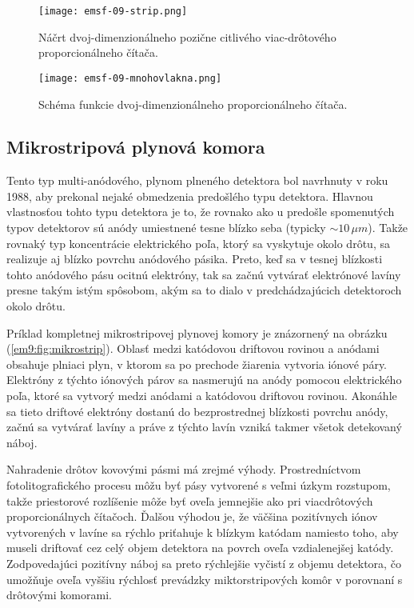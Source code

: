 \documentclass[../../main.tex]{subfiles}
\begin{document}
\begin{figure}[!h]
\texttt{[image: emsf-09-strip.png]}
\centering
\caption{Náčrt dvoj-dimenzionálneho pozične citlivého viac-drôtového proporcionálneho čítača.}
\label{em9:fig:strip}
\end{figure}
\begin{figure}[!h]
\texttt{[image: emsf-09-mnohovlakna.png]}
\centering
\caption{Schéma funkcie dvoj-dimenzionálneho proporcionálneho čítača.}
\label{em9:fig:mnohovlakna}
\end{figure}

\subsection{Mikrostripová plynová komora}
Tento typ multi-anódového, plynom plneného detektora bol navrhnuty v roku 1988, aby prekonal nejaké obmedzenia predošlého typu detektora. Hlavnou vlastnosťou tohto typu detektora je to, že rovnako ako u predošle spomenutých typov detektorov sú anódy umiestnené tesne blízko seba (typicky $\sim 10\,\mu m$). Takže rovnaký typ koncentrácie elektrického poľa, ktorý sa vyskytuje okolo drôtu, sa realizuje aj blízko povrchu anódového pásika. Preto, keď sa v tesnej blízkosti tohto anódového pásu ocitnú elektróny, tak sa začnú vytvárať elektrónové lavíny presne takým istým spôsobom, akým sa to dialo v predchádzajúcich detektoroch okolo drôtu.

Príklad kompletnej mikrostripovej plynovej komory je znázornený na obrázku (\ref{em9:fig:mikrostrip}). Oblasť medzi katódovou driftovou rovinou a anódami obsahuje plniaci plyn, v ktorom sa po prechode žiarenia vytvoria iónové páry. Elektróny z týchto iónových párov sa nasmerujú na anódy pomocou elektrického poľa, ktoré  sa vytvorý medzi anódami a katódovou driftovou rovinou. Akonáhle sa tieto driftové elektróny dostanú do bezprostrednej blízkosti povrchu anódy, začnú sa vytvárať lavíny a práve z týchto lavín vzniká takmer všetok detekovaný náboj. 

Nahradenie drôtov kovovými pásmi má zrejmé výhody. Prostredníctvom fotolitografického procesu môžu byť pásy vytvorené s veľmi úzkym rozstupom, takže priestorové rozlíšenie môže byť oveľa jemnejšie ako pri viacdrôtových proporcionálnych čítačoch. Ďalšou výhodou je, že väčšina pozitívnych iónov vytvorených v lavíne sa rýchlo priťahuje k blízkym katódam namiesto toho, aby museli driftovať cez celý objem detektora na povrch oveľa vzdialenejšej katódy. Zodpovedajúci pozitívny náboj sa preto rýchlejšie vyčistí z objemu detektora, čo umožňuje oveľa vyššiu rýchlosť prevádzky miktorstripových komôr v porovnaní s drôtovými komorami.
\end{document}
